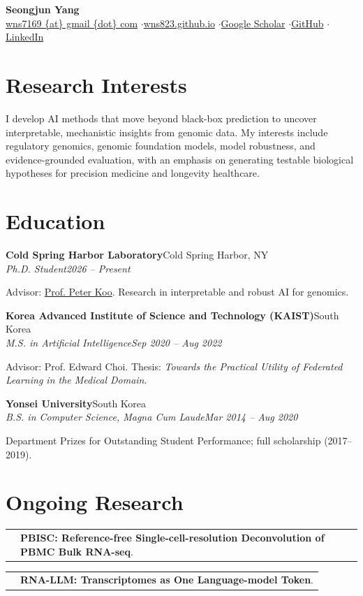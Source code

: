 \documentclass[10pt,letterpaper]{article}
\makeatletter
\newcommand{\entry}[4]{%
  \textbf{#1}\hfill {\small #2}\\[-1pt]
  \textit{#3}\hfill \textit{\small #4}\par\vspace{2pt}
}
\newcommand{\publication}[2]{%
  \begin{tabularx}{\linewidth}{@{}l@{}>{\raggedright\arraybackslash\small}X@{}}
    \makebox[0.105\linewidth][l]{\small\color{muted}#1} & #2
  \end{tabularx}\par\vspace{7pt}
}
\makeatother
\begin{document}
\begin{center}
  {\fontsize{22}{25}\selectfont\bfseries Seongjun Yang}\\[4pt]
  \small
  \href{mailto:wns7169@gmail.com}{wns7169 \{at\} gmail \{dot\} com}
  \enspace$\cdot$\enspace \href{https://wns823.github.io/}{wns823.github.io}
  \enspace$\cdot$\enspace \href{https://scholar.google.com/citations?user=OxSABfkAAAAJ\&hl=en}{Google Scholar}
  \enspace$\cdot$\enspace \href{https://github.com/wns823}{GitHub}
  \enspace$\cdot$\enspace \href{https://www.linkedin.com/in/seongjun-yang-b338061b0}{LinkedIn}
\end{center}

\section*{Research Interests}
I develop AI methods that move beyond black-box prediction to uncover interpretable, mechanistic insights from genomic data. My interests include regulatory genomics, genomic foundation models, model robustness, and evidence-grounded evaluation, with an emphasis on generating testable biological hypotheses for precision medicine and longevity healthcare.

\section*{Education}
\entry{Cold Spring Harbor Laboratory}{Cold Spring Harbor, NY}{Ph.D. Student}{2026 -- Present}
Advisor: \href{https://koo-lab.github.io/people/peter_koo/index.html}{Prof. Peter Koo}. Research in interpretable and robust AI for genomics.

\vspace{4pt}
\entry{Korea Advanced Institute of Science and Technology (KAIST)}{South Korea}{M.S. in Artificial Intelligence}{Sep 2020 -- Aug 2022}
Advisor: Prof. Edward Choi. Thesis: \textit{Towards the Practical Utility of Federated Learning in the Medical Domain}.

\vspace{4pt}
\entry{Yonsei University}{South Korea}{B.S. in Computer Science, Magna Cum Laude}{Mar 2014 -- Aug 2020}
Department Prizes for Outstanding Student Performance; full scholarship (2017--2019).

\section*{Ongoing Research}
\publication{Under review}{\textbf{PBISC: Reference-free Single-cell-resolution Deconvolution of PBMC Bulk RNA-seq}.}
\publication{Under review}{\textbf{RNA-LLM: Transcriptomes as One Language-model Token}.}
\end{document}
